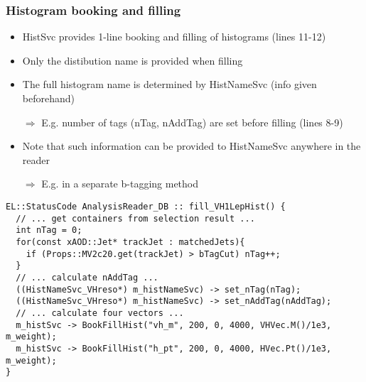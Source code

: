 \documentclass{beamer}
\begin{document}
\begin{frame}[fragile,t]
\frametitle{Histogram booking and filling}
\begin{itemize}
 \item HistSvc provides 1-line booking and filling of histograms (lines 11-12)
 \item Only the distibution name is provided when filling
 \item The full histogram name is determined by HistNameSvc (info given beforehand)
 \item[$\Rightarrow$] E.g. number of tags (nTag, nAddTag) are set before filling (lines 8-9)
 \item Note that such information can be provided to HistNameSvc anywhere in the reader
 \item[$\Rightarrow$] E.g. in a separate b-tagging method
\end{itemize}
\begin{center}
\begin{minipage}{0.9\textwidth}
{\tiny
\begin{lstlisting}
EL::StatusCode AnalysisReader_DB :: fill_VH1LepHist() {
  // ... get containers from selection result ...
  int nTag = 0;
  for(const xAOD::Jet* trackJet : matchedJets){
    if (Props::MV2c20.get(trackJet) > bTagCut) nTag++;
  }
  // ... calculate nAddTag ...
  ((HistNameSvc_VHreso*) m_histNameSvc) -> set_nTag(nTag);
  ((HistNameSvc_VHreso*) m_histNameSvc) -> set_nAddTag(nAddTag);
  // ... calculate four vectors ...
  m_histSvc -> BookFillHist("vh_m", 200, 0, 4000, VHVec.M()/1e3, m_weight);
  m_histSvc -> BookFillHist("h_pt", 200, 0, 4000, HVec.Pt()/1e3, m_weight);
}
\end{lstlisting}
}
\end{minipage}
\end{center}
\end{frame}
\end{document}
